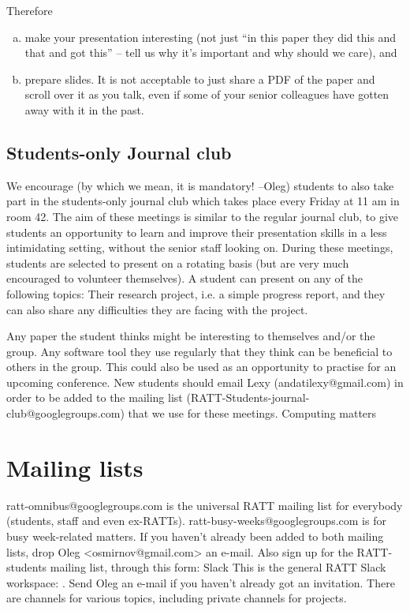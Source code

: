 Therefore 
\begin{enumerate}[(a)]
    \item make your presentation interesting (not just “in this paper they did this and that and got this” -- tell us why it’s important and why should we care), and 
    \item prepare slides. It is not acceptable to just share a PDF of the paper and scroll over it as you talk, even if some of your senior colleagues have gotten away with it in the past.
\end{enumerate}

\subsection{Students-only Journal club}
We encourage (by which we mean, it is mandatory! --Oleg) students to also take part in the students-only journal club which takes place every Friday at 11 am in room 42. The aim of these meetings is similar to the regular journal club, to give students an opportunity to learn and improve their presentation skills in a less intimidating setting, without the senior staff looking on. During these meetings, students are selected to present on a rotating basis (but are very much encouraged to volunteer themselves). A student can present on any of the following topics:
Their research project, i.e. a simple progress report, and they can also share any difficulties they are facing with the project.

Any paper the student thinks might be interesting to themselves and/or the group.
Any software tool they use regularly that they think can be beneficial to others in the group.
This could also be used as an opportunity to practise for an upcoming conference. New students should email Lexy (andatilexy@gmail.com) in order to be added to the mailing list (RATT-Students-journal-club@googlegroups.com) that we use for these meetings.
Computing matters

\section{Mailing lists}
ratt-omnibus@googlegroups.com is the universal RATT mailing list for everybody (students, staff and even ex-RATTs).
ratt-busy-weeks@googlegroups.com is for busy week-related matters.
If you haven’t already been added to both mailing lists, drop Oleg <osmirnov@gmail.com> an e-mail.
Also sign up for the RATT-students mailing list, through this form:  
Slack
This is the general RATT Slack workspace: . Send Oleg an e-mail if you haven’t already got an invitation. There are channels for various topics, including private channels for projects.

